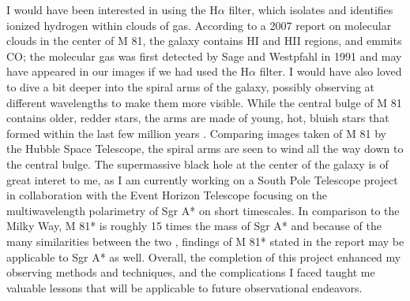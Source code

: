 \documentclass[]{aastex63}
\begin{document}
I would have been interested in using the H$\alpha$ filter, which isolates and identifies ionized hydrogen within clouds of gas. According to a 2007 report on molecular clouds in the center of M 81, the galaxy contains HI and HII regions, and emmits CO; the molecular gas was first detected by Sage and Westpfahl in 1991 \citep{Casasola} and may have appeared in our images if we had used the H$\alpha$ filter. I would have also loved to dive a bit deeper into the spiral arms of the galaxy, possibly observing at different wavelengths to make them more visible. While the central bulge of M 81 contains older, redder stars, the arms are made of young, hot, bluish stars that formed within the last few million years \citep{nasa}. Comparing images taken of M 81 by the Hubble Space Telescope, the spiral arms are seen to wind all the way down to the central bulge. The supermassive black hole at the center of the galaxy is of great interet to me, as I am currently working on a South Pole Telescope project in collaboration with the Event Horizon Telescope focusing on the multiwavelength polarimetry of Sgr A* on short timescales. In comparison to the Milky Way, M 81* is roughly 15 times the mass of Sgr A* \citep{nasa} and because of the many similarities between the two \citep{Brunthaler}, findings of M 81* stated in the report may be applicable to Sgr A* as well. Overall, the completion of this project enhanced my observing methods and techniques, and the complications I faced taught me valuable lessons that will be applicable to future observational endeavors.






\end{document}
